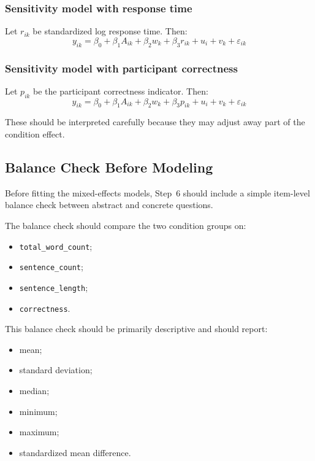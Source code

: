 \documentclass[11pt]{article}
\begin{document}
\subsubsection{Sensitivity model with response time}
Let \(r_{ik}\) be standardized log response time.
Then:
\begin{equation}
y_{ik}
=
\beta_0
+
\beta_1 A_{ik}
+
\beta_2 w_k
+
\beta_3 r_{ik}
+
u_i
+
v_k
+
\varepsilon_{ik}
\end{equation}

\subsubsection{Sensitivity model with participant correctness}
Let \(p_{ik}\) be the participant correctness indicator.
Then:
\begin{equation}
y_{ik}
=
\beta_0
+
\beta_1 A_{ik}
+
\beta_2 w_k
+
\beta_3 p_{ik}
+
u_i
+
v_k
+
\varepsilon_{ik}
\end{equation}

These should be interpreted carefully because they may adjust away part of the condition effect.

\subsection{Balance Check Before Modeling}
Before fitting the mixed-effects models, Step~6 should include a simple item-level balance check
between abstract and concrete questions.

The balance check should compare the two condition groups on:
\begin{itemize}
    \item \texttt{total\_word\_count};
    \item \texttt{sentence\_count};
    \item \texttt{sentence\_length};
    \item \texttt{correctness}.
\end{itemize}

This balance check should be primarily descriptive and should report:
\begin{itemize}
    \item mean;
    \item standard deviation;
    \item median;
    \item minimum;
    \item maximum;
    \item standardized mean difference.
\end{itemize}
\end{document}
